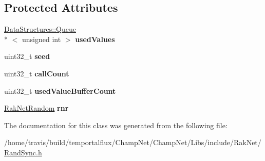 \subsection*{Protected Attributes}
\begin{DoxyCompactItemize}
\item 
\hypertarget{class_rak_net_1_1_rak_net_random_sync_ae82078ada8dc57d6970c0cc6fb2cc6fb}{\hyperlink{class_data_structures_1_1_queue}{Data\-Structures\-::\-Queue}\\*
$<$ unsigned int $>$ {\bfseries used\-Values}}\label{class_rak_net_1_1_rak_net_random_sync_ae82078ada8dc57d6970c0cc6fb2cc6fb}

\item 
\hypertarget{class_rak_net_1_1_rak_net_random_sync_ae8a31f907b36ec4d9dc9031de0e9a700}{uint32\-\_\-t {\bfseries seed}}\label{class_rak_net_1_1_rak_net_random_sync_ae8a31f907b36ec4d9dc9031de0e9a700}

\item 
\hypertarget{class_rak_net_1_1_rak_net_random_sync_aa21514d8ff14d47567365f269bc8d07c}{uint32\-\_\-t {\bfseries call\-Count}}\label{class_rak_net_1_1_rak_net_random_sync_aa21514d8ff14d47567365f269bc8d07c}

\item 
\hypertarget{class_rak_net_1_1_rak_net_random_sync_a9c2bd101765a0d1e5976b012d3a37e95}{uint32\-\_\-t {\bfseries used\-Value\-Buffer\-Count}}\label{class_rak_net_1_1_rak_net_random_sync_a9c2bd101765a0d1e5976b012d3a37e95}

\item 
\hypertarget{class_rak_net_1_1_rak_net_random_sync_ad0916b2b454ebebd2e337d258b6336c9}{\hyperlink{class_rak_net_1_1_rak_net_random}{Rak\-Net\-Random} {\bfseries rnr}}\label{class_rak_net_1_1_rak_net_random_sync_ad0916b2b454ebebd2e337d258b6336c9}

\end{DoxyCompactItemize}


The documentation for this class was generated from the following file\-:\begin{DoxyCompactItemize}
\item 
/home/travis/build/temportalflux/\-Champ\-Net/\-Champ\-Net/\-Libs/include/\-Rak\-Net/\hyperlink{_rand_sync_8h}{Rand\-Sync.\-h}\end{DoxyCompactItemize}
